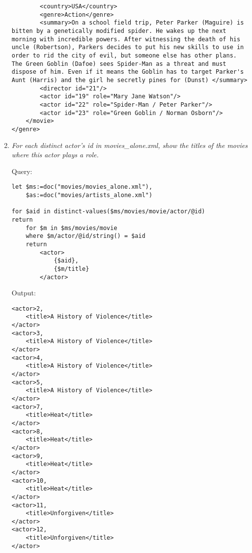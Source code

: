\documentclass[a4paper, notitlepage]{article}
\begin{document}
\begin{enumerate}
\begin{lstlisting}
		<country>USA</country>
		<genre>Action</genre>
		<summary>On a school field trip, Peter Parker (Maguire) is bitten by a genetically modified spider. He wakes up the next morning with incredible powers. After witnessing the death of his uncle (Robertson), Parkers decides to put his new skills to use in order to rid the city of evil, but someone else has other plans. The Green Goblin (Dafoe) sees Spider-Man as a threat and must dispose of him. Even if it means the Goblin has to target Parker's Aunt (Harris) and the girl he secretly pines for (Dunst) </summary>
		<director id="21"/>
		<actor id="19" role="Mary Jane Watson"/>
		<actor id="22" role="Spider-Man / Peter Parker"/>
		<actor id="23" role="Green Goblin / Norman Osborn"/>
	</movie>
</genre>
\end{lstlisting} 

\item  
  \emph{ For each distinct actor's id in movies\_alone.xml, show the titles of the movies where this actor plays a role.} 
  
Query: 
  
\begin{lstlisting}
let $ms:=doc("movies/movies_alone.xml"),
    $as:=doc("movies/artists_alone.xml")
    
for $aid in distinct-values($ms/movies/movie/actor/@id)
return   
    for $m in $ms/movies/movie
    where $m/actor/@id/string() = $aid
    return 
        <actor>
            {$aid},
            {$m/title}
        </actor>
\end{lstlisting}
  
Output:
  
\begin{lstlisting}
<actor>2,
	<title>A History of Violence</title>
</actor>
<actor>3,
	<title>A History of Violence</title>
</actor>
<actor>4,
	<title>A History of Violence</title>
</actor>
<actor>5,
	<title>A History of Violence</title>
</actor>
<actor>7,
	<title>Heat</title>
</actor>
<actor>8,
	<title>Heat</title>
</actor>
<actor>9,
	<title>Heat</title>
</actor>
<actor>10,
	<title>Heat</title>
</actor>
<actor>11,
	<title>Unforgiven</title>
</actor>
<actor>12,
	<title>Unforgiven</title>
</actor>
\end{lstlisting} 

\end{enumerate}
\end{document}
